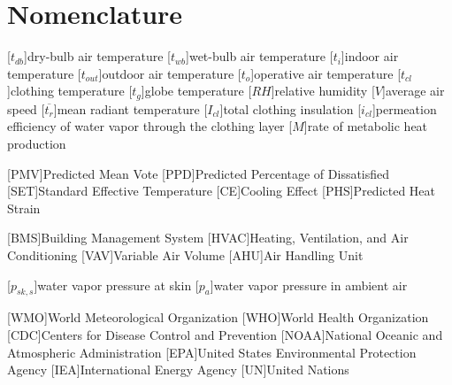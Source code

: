 
\section*{Nomenclature}
\renewcommand{\baselinestretch}{0.75}\normalsize
\renewcommand{\aclabelfont}[1]{\textsc{\acsfont{#1}}}
\begin{acronym}[longest]

    [$t_{db}$]{dry-bulb air temperature}
    [$t_{wb}$]{wet-bulb air temperature}
    [$t_{i}$]{indoor air temperature}
    [$t_{out}$]{outdoor air temperature}
    [$t_{o}$]{operative air temperature}
    [$t_{cl}$]{clothing temperature}
    [$t_{g}$]{globe temperature}
    [$RH$]{relative humidity\acroextra{, \%}}
    [$V$]{average air speed}
    [$\overline{t_{r}}$]{mean radiant temperature}
    [$I_{cl}$]{total clothing insulation}
    [$i_{cl}$]{permeation efficiency of water vapor through the clothing layer}
    [$M$]{rate of metabolic heat production}

    [PMV]{Predicted Mean Vote}
    [PPD]{Predicted Percentage of Dissatisfied\acroextra{, \%}}
    [SET]{Standard Effective Temperature}
    [CE]{Cooling Effect}
    [PHS]{Predicted Heat Strain}

    [BMS]{Building Management System}
    [HVAC]{Heating, Ventilation, and Air Conditioning}
    [VAV]{Variable Air Volume}
    [AHU]{Air Handling Unit}

    [$p_{sk,s}$]{water vapor pressure at skin}
    [$p_{a}$]{water vapor pressure in ambient air}

    [WMO]{World Meteorological Organization}
    [WHO]{World Health Organization}
    [CDC]{Centers for Disease Control and Prevention}
    [NOAA]{National Oceanic and Atmospheric Administration}
    [EPA]{United States Environmental Protection Agency}
    [IEA]{International Energy Agency}
    [UN]{United Nations}

\end{acronym}
\renewcommand{\baselinestretch}{1}\normalsize
